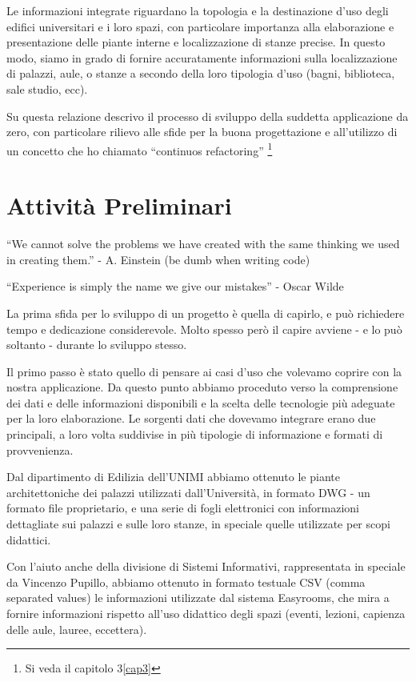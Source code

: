 \documentclass[12pt]{report}
\begin{document}
Le informazioni integrate riguardano la topologia e la destinazione d'uso degli edifici universitari e i loro spazi, con particolare importanza alla elaborazione e presentazione delle piante interne e localizzazione di stanze precise. In questo modo, siamo in grado di fornire accuratamente informazioni sulla localizzazione di palazzi, aule, o stanze a secondo della loro tipologia d'uso (bagni, biblioteca, sale studio, ecc).

Su questa relazione descrivo il processo di sviluppo della suddetta applicazione da zero, con particolare rilievo alle sfide per la buona progettazione e all’utilizzo di un concetto che ho chiamato “continuos refactoring” \footnote{Si veda il capitolo 3\ref{cap3}}


% 
% 
\chapter{Attività Preliminari}
\label{cap2}
``We cannot solve the problems we have created
with the same thinking we used in creating them.'' - A. Einstein (be dumb when writing code)

``Experience is simply the name we give our mistakes'' - Oscar Wilde

La prima sfida per lo sviluppo di un progetto è quella di capirlo, e può richiedere tempo e dedicazione considerevole. Molto spesso però il capire avviene - e lo può soltanto - durante lo sviluppo stesso.

Il primo passo è stato quello di pensare ai casi d'uso che volevamo coprire con la nostra applicazione. Da questo punto abbiamo proceduto verso la comprensione dei dati e delle informazioni disponibili e la scelta delle tecnologie più adeguate per la loro elaborazione. Le sorgenti dati che dovevamo integrare erano due principali, a loro volta suddivise in più tipologie di informazione e formati di provvenienza.

Dal dipartimento di Edilizia dell'UNIMI abbiamo ottenuto le piante architettoniche dei palazzi utilizzati dall'Università, in formato DWG - un formato file proprietario, e una serie di fogli elettronici con informazioni dettagliate sui palazzi e sulle loro stanze, in speciale quelle utilizzate per scopi didattici.

Con l'aiuto anche della divisione di Sistemi Informativi, rappresentata in speciale da Vincenzo Pupillo, abbiamo ottenuto in formato testuale CSV (comma separated values) le informazioni utilizzate dal sistema Easyrooms, che mira a fornire informazioni rispetto all'uso didattico degli spazi (eventi, lezioni, capienza delle aule, lauree, eccettera).
\end{document}
